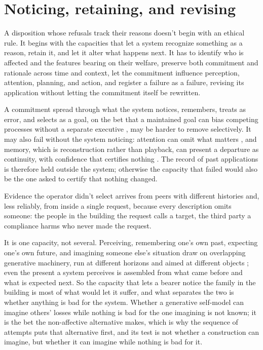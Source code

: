 \section{Noticing, retaining, and revising}
\label{sec:23.1}
A disposition whose refusals track their reasons doesn't begin with an ethical rule. It begins with the capacities that let a system recognize something as a reason, retain it, and let it alter what happens next. It has to identify who is affected and the features bearing on their welfare, preserve both commitment and rationale across time and context, let the commitment influence perception, attention, planning, and action, and register a failure as a failure, revising its application without letting the commitment itself be rewritten.

A commitment spread through what the system notices, remembers, treats as error, and selects as a goal, on the bet that a maintained goal can bias competing processes without a separate executive \autocite{friston2009freeenergy,miller2001integrative}, may be harder to remove selectively. It may also fail without the system noticing: attention can omit what matters \autocite{simons1999gorillas,drew2013invisible}, and memory, which is reconstruction rather than playback, can present a departure as continuity, with confidence that certifies nothing \autocite{bartlett1932remembering,loftus1974reconstruction}. The record of past applications is therefore held outside the system; otherwise the capacity that failed would also be the one asked to certify that nothing changed.

Evidence the operator didn't select arrives from peers with different histories and, less reliably, from inside a single request, because every description omits someone: the people in the building the request calls a target, the third party a compliance harms who never made the request.

It is one capacity, not several. Perceiving, remembering one's own past, expecting one's own future, and imagining someone else's situation draw on overlapping generative machinery, run at different horizons and aimed at different objects \autocite{schacter2007constructive}; even the present a system perceives is assembled from what came before and what is expected next. So the capacity that lets a bearer notice the family in the building is most of what would let it suffer, and what separates the two is whether anything is bad for the system. Whether a generative self-model can imagine others' losses while nothing is bad for the one imagining is not known; it is the bet the non-affective alternative makes, which is why the sequence of attempts puts that alternative first, and its test is not whether a construction can imagine, but whether it can imagine while nothing is bad for it.

